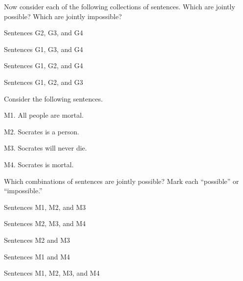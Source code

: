 Now consider each of the following collections of sentences. Which are jointly possible? Which are jointly impossible?
\begin{compactlist}
\item Sentences G2, G3, and G4
\item Sentences G1, G3, and G4
\item Sentences G1, G2, and G4
\item Sentences G1, G2, and G3
\end{compactlist}

\problempart Consider the following sentences.
\begin{compactlist}%
\item[M1.] \label{itm:allmortal} All people are mortal.
\item[M2.] \label{itm:socperson} Socrates is a person.
\item[M3.] \label{itm:socnotdie} Socrates will never die.
\item[M4.] \label{itm:socmortal} Socrates is mortal.
\end{compactlist}
Which combinations of sentences are jointly possible? Mark each ``possible'' or ``impossible.''
\begin{compactlist}
\item Sentences M1, M2, and M3
\item Sentences M2, M3, and M4
\item Sentences M2 and M3
\item Sentences M1 and M4
\item Sentences M1, M2, M3, and M4
\end{compactlist}

